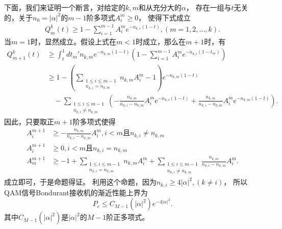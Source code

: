 下面，我们来证明一个断言，对给定的$k,m$和从充分大的$\alpha$，
存在一组与$t$无关的，关于$n_0 = |\alpha|^2$的$m-1$阶多项式$A_i^m \ge 0$，
使得下式成立
\begin{equation}
\begin{split}
Q_m^k(t) \ge 1 - \sum_{i=1}^{m-1} A_i^m e^{-n_{k,i}(1-t)}, (m=1,2,...,k).
\end{split}
\end{equation}
当$m=1$时，显然成立。假设上式在$m<1$时成立，那么在$m+1$时，有
\begin{equation}
\begin{split}
Q_{m+1}^k(t) &\ge \int_t^1  dt_{m}' n_{k,m} e^{-n_{k,m}(1-t)} (1 - \sum_{i=1}^{m-1} A_i^m e^{-n_{k,i}(1-t_m)} ) \\
             &\ge 1 - \left( \sum_{\substack{1\le i \le m-1 \\
                n_{k,i} = n_{k,m}} }  n_{k,m}A_i^{m} -1\right) e^{-n_{k,m}(1-t)}  \\
             & \quad - \sum_{\substack{1\le i \le m-1 \\
                n_{k,i} \neq n_{k,m}}} \left(-\frac{n_{k,m}}{n_{k,i} - n_{k,m}} A_i^m e^{-n_{k,i}(1-t)}  + \frac{n_{k,m}}{n_{k,i} - n_{k,m}} A_i^m e^{-n_{k,m}(1-t)}    \right) .
\end{split}
\end{equation}
因此，只要取正$m+1$阶多项式使得
\begin{equation}
\begin{split}
A_i^{m+1} &\ge -\frac{n_{k,m}}{n_{k,i} - n_{k,m}} A_i^m , i<m \text{且} n_{k,i} \neq n_{k,m}\\
A_i^{m+1} &\ge 0 , i<m \text{且} n_{k,i} = n_{k,m}\\
A_m^{m+1} &\ge -1 + \sum_{\substack{1\le i \le m-1 \\
                n_{k,i} = n_{k,m}} }  n_{k,m}A_i^{m} + \sum_{\substack{1\le i \le m-1 \\
                n_{k,i} \neq n_{k,m}}} \frac{n_{k,m}}{n_{k,i} - n_{k,m}} A_i^m .
\end{split}
\end{equation}
成立即可，于是命题得证。
利用这个命题，因为$n_{k,i} \ge 4|\alpha|^2,(k \neq i)$，
所以QAM信号Bondurant接收机的渐近性能上界为
\begin{equation}
P_e \le C_{M-1}(|\alpha|^2) e^{-4|\alpha|^2}.
\label{eq:QAM-Bondurant-approx-err}
\end{equation}
其中$C_{M-1}(|\alpha|^2)$是$|\alpha|^2$的$M-1$阶正多项式。

